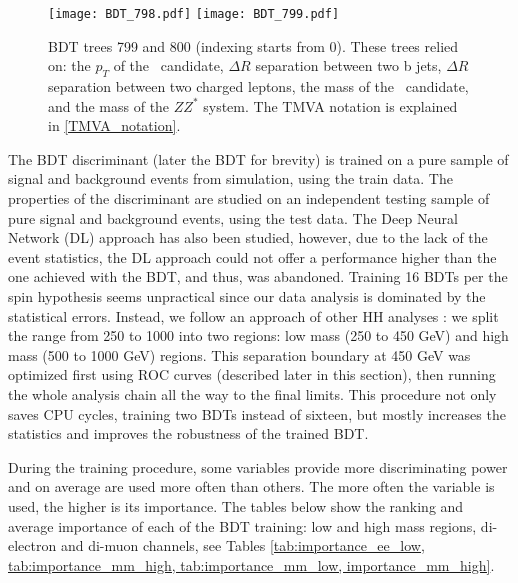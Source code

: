\begin{small}
\begin{figure}[H]
  \begin{center}
    \texttt{[image: BDT\_798.pdf]}
    \texttt{[image: BDT\_799.pdf]}\\
     \caption[BDT trees 799 and 800.]{BDT trees 799 and 800 (indexing starts from 0). These trees relied on: the $p_T$ of the \Zll~candidate, 
     $\Delta R$ separation between two b jets,
     $\Delta R$ separation between two charged leptons, 
      the mass of the \HBB~candidate, and the mass of the $ZZ^*$ system. The TMVA notation is explained in \ref{TMVA_notation}.}       
     \label{fig:bdt_trees_3}
  \end{center}
\end{figure}
           
The BDT discriminant (later the BDT for brevity) is trained on a pure sample of signal and background events from simulation, using the train data. The properties of the discriminant are studied on an independent testing sample of pure signal and background events, using the test data. The Deep Neural Network (DL) approach has also been studied, however, due to the lack of the event statistics, the DL approach could not offer a performance higher than the one achieved with the BDT, and thus, was abandoned. Training 16 BDTs per the spin hypothesis seems unpractical since our data analysis is dominated by the statistical errors. Instead, we follow an approach of other HH analyses \cite{HH_combination}: we split the range from 250 to 1000 into two regions: low mass (250 to 450 GeV) and high mass (500 to 1000 GeV) regions. This separation boundary at 450 GeV was optimized first using ROC curves (described later in this section), then running the whole analysis chain all the way to the final limits. This procedure not only saves CPU cycles, training two BDTs instead of sixteen, but mostly increases the statistics and improves the robustness of the trained BDT. 
           
During the training procedure, some variables provide more discriminating power and on average are used more often than others. The more often the variable is used, the higher is its importance. The tables below show the ranking and average importance of each of the BDT training: low and high mass regions, di-electron and di-muon channels, see Tables \ref{tab:importance_ee_low, tab:importance_mm_high, tab:importance_mm_low, importance_mm_high}. 


\end{small}
